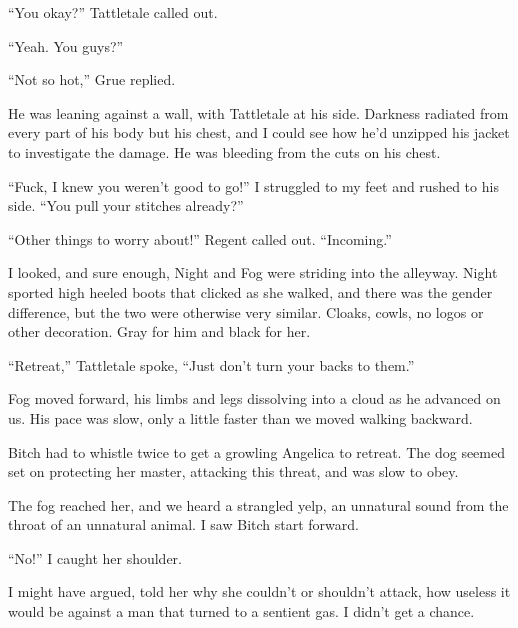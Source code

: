 ``You okay?'' Tattletale called out.



``Yeah.  You guys?''



``Not so hot,'' Grue replied.



He was leaning against a wall, with Tattletale at his side.  Darkness radiated from every part of his body but his chest, and I could see how  he'd unzipped his jacket to investigate the damage.  He was bleeding from the cuts on his chest.



``Fuck, I knew you weren't good to go!'' I struggled to my feet and rushed to his side.  ``You pull your stitches already?''



``Other things to worry about!'' Regent called out.  ``Incoming.''



I looked, and sure enough, Night and Fog were striding into the alleyway.  Night sported high heeled boots that clicked as she walked, and there was the gender difference, but the two were otherwise very similar.  Cloaks, cowls, no logos or other decoration.  Gray for him and black for her.



``Retreat,'' Tattletale spoke, ``Just don't turn your backs to them.''



Fog moved forward, his limbs and legs dissolving into a cloud as he advanced on us.  His pace was slow, only a little faster than we moved walking backward.



Bitch had to whistle twice to get a growling Angelica to retreat.  The dog seemed set on protecting her master, attacking this threat, and was slow to obey.



The fog reached her, and we heard a strangled yelp, an unnatural sound from the throat of an unnatural animal.  I saw Bitch start forward.



``No!'' I caught her shoulder.



I might have argued, told her why she couldn't or shouldn't attack, how useless it would be against a man that turned to a sentient gas.  I didn't get a chance.



